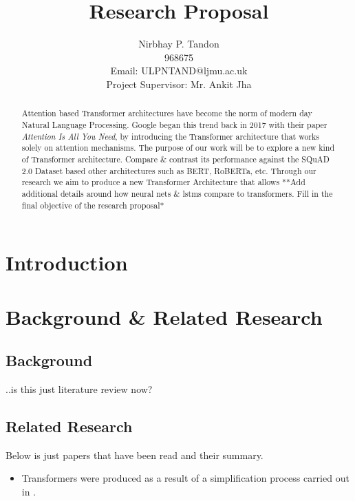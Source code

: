 \documentclass[11pt]{article}
\begin{document}
\title{Research Proposal}

\author{Nirbhay P. Tandon\\968675\\Email: ULPNTAND@ljmu.ac.uk\\
Project Supervisor: Mr. Ankit Jha
}
\date{}
\maketitle


\begin{abstract}
Attention based Transformer architectures have become the norm of modern day Natural Language Processing. Google began this trend back in 2017 with their paper \textit{Attention Is All You Need}\cite{atayl}, by introducing the Transformer architecture that works solely on attention mechanisms. The purpose of our work will be to explore a new kind of Transformer architecture. Compare \& contrast its performance against the SQuAD 2.0 Dataset\cite{dataset} based other architectures such as BERT\cite{bert}, RoBERTa\cite{roberta}, etc. Through our research we aim to produce a new Transformer Architecture that allows **Add additional details around how neural nets \& lstms compare to transformers. Fill in the final objective of the research proposal*
\end{abstract}
\newpage
\tableofcontents
\newpage
\section{Introduction}\label{Introduction}

\section{Background \& Related Research}\label{Section-Frameworks}

\subsection{Background}
..is this just literature review now?
\subsection{Related Research}
Below is just papers that have been read and their summary. 

\begin{itemize}
	\item Transformers were produced as a result of a simplification process carried out in \cite{atayl}. 
\end{itemize}
\newpage
\end{document}
